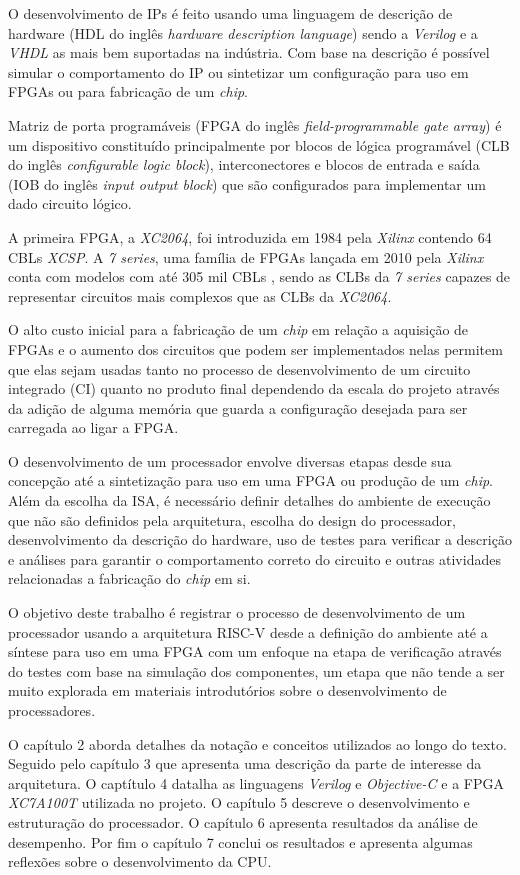 O desenvolvimento de IPs é feito usando uma linguagem de descrição de hardware 
(HDL do inglês \emph{hardware description language}) sendo a \emph{Verilog} e a 
\emph{VHDL} as mais bem suportadas na indústria. Com base na descrição é possível 
simular o comportamento do IP ou sintetizar um configuração para uso em FPGAs ou 
para fabricação de um \emph{chip}.

Matriz de porta programáveis (FPGA do inglês \emph{field-programmable gate array}) é um 
dispositivo constituído principalmente por blocos de lógica programável (CLB do inglês 
\emph{configurable logic block}), interconectores e blocos de entrada e saída 
(IOB do inglês \emph{input output block}) que são configurados para implementar um dado
circuito lógico.

A primeira FPGA, a \emph{XC2064}, foi introduzida em 1984 pela \emph{Xilinx} \citep{8392473}
contendo 64 CBLs \emph{XCSP}. A \emph{7 series}, uma família de FPGAs lançada em 2010 pela \emph{Xilinx} 
\citep{S7LN} conta com modelos com até 305 mil CBLs \citep{7CLB}, sendo as CLBs da \emph{7 series}
capazes de representar circuitos mais complexos que as CLBs da \emph{XC2064}.

O alto custo inicial para a fabricação de um \emph{chip} em relação a aquisição de FPGAs e o aumento dos
circuitos que podem ser implementados nelas permitem que elas sejam usadas tanto no processo de 
desenvolvimento de um circuito integrado (CI) quanto no produto final dependendo da escala do projeto
através da adição de alguma memória que guarda a configuração desejada para ser carregada ao ligar a FPGA.

O desenvolvimento de um processador envolve diversas etapas desde sua concepção até a sintetização para
uso em uma FPGA ou produção de um \emph{chip}. Além da escolha da ISA, é necessário definir detalhes do ambiente 
de execução que não são definidos pela arquitetura, escolha do design do processador, desenvolvimento da 
descrição do hardware, uso de testes para verificar a descrição e análises para garantir o comportamento
correto do circuito e outras atividades relacionadas a fabricação do \emph{chip} em si.

O objetivo deste trabalho é registrar o processo de desenvolvimento de um processador usando a arquitetura 
RISC-V desde a definição do ambiente até a síntese para uso em uma FPGA com um enfoque na etapa de verificação 
através do testes com base na simulação dos componentes, um etapa que não tende a ser muito explorada em materiais 
introdutórios sobre o desenvolvimento de processadores.

O capítulo 2 aborda detalhes da notação e conceitos utilizados ao longo do texto. Seguido pelo capítulo 3 que apresenta uma descrição
da parte de interesse da arquitetura. O captítulo 4 datalha as linguagens \emph{Verilog} e \emph{Objective-C}
e a FPGA \emph{XC7A100T} utilizada no projeto. O capítulo 5 descreve o desenvolvimento e estruturação do processador.
O capítulo 6 apresenta resultados da análise de desempenho. Por fim o capítulo 7 conclui os resultados e apresenta
algumas reflexões sobre o desenvolvimento da CPU.
